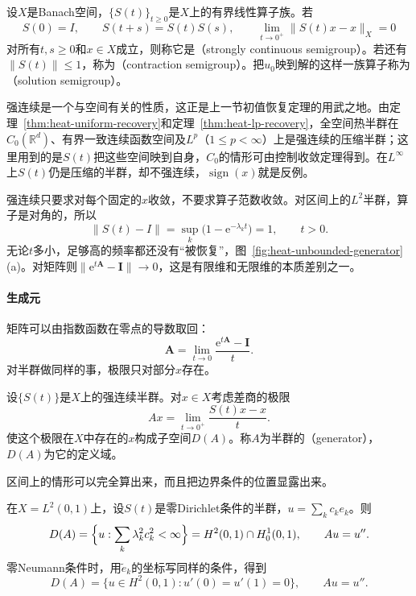 \begin{definition}[强连续半群]
\label{def:heat-c0-semigroup}
设$X$是Banach空间，$\{S(t)\}_{t\geq0}$是$X$上的有界线性算子族。若
\begin{equation}
 S(0)=I,\qquad S(t+s)=S(t)S(s),\qquad \lim_{t\to0^+}\lVert S(t)x-x\rVert_X=0
 \label{eq:heat-c0-semigroup}
\end{equation}
对所有$t,s\geq0$和$x\in X$成立，则称它是（strongly continuous semigroup）。若还有$\lVert S(t)\rVert\leq1$，称为（contraction semigroup）。把$u_0$映到解的这样一族算子称为（solution semigroup）。
\end{definition}

强连续是一个与空间有关的性质，这正是上一节初值恢复定理的用武之地。由定理~\ref{thm:heat-uniform-recovery}和定理~\ref{thm:heat-lp-recovery}，全空间热半群在$C_0(\mathbb{R}^{d})$、有界一致连续函数空间及$L^p$（$1\leq p<\infty$）上是强连续的压缩半群；这里用到的是$S(t)$把这些空间映到自身，$C_0$的情形可由控制收敛定理得到。在$L^\infty$上$S(t)$仍是压缩的半群，却不强连续，$\operatorname{sign}(x)$就是反例。

强连续只要求对每个固定的$x$收敛，不要求算子范数收敛。对区间上的$L^2$半群，算子是对角的，所以
\[
 \lVert S(t)-I\rVert=\sup_k\bigl(1-\mathrm{e}^{-\lambda_kt}\bigr)=1,\qquad t>0 .
\]
无论$t$多小，足够高的频率都还没有“被恢复”，图~\ref{fig:heat-unbounded-generator}(a)。对矩阵则$\lVert\mathrm{e}^{t\bm{A}}-\bm{I}\rVert\to0$，这是有限维和无限维的本质差别之一。

\paragraph{生成元}
矩阵可以由指数函数在零点的导数取回：
\[
 \bm{A}=\lim_{t\to0}\frac{\mathrm{e}^{t\bm{A}}-\bm{I}}{t} .
\]
对半群做同样的事，极限只对部分$x$存在。

\begin{definition}[生成元]
\label{def:heat-generator}
设$\{S(t)\}$是$X$上的强连续半群。对$x\in X$考虑差商的极限
\begin{equation}
 Ax=\lim_{t\to0^+}\frac{S(t)x-x}{t} .
 \label{eq:heat-generator-limit}
\end{equation}
使这个极限在$X$中存在的$x$构成子空间$D(A)$。称$A$为半群的（generator），$D(A)$为它的定义域。
\end{definition}

区间上的情形可以完全算出来，而且把边界条件的位置显露出来。

\begin{theorem}[区间热半群的生成元]
\label{thm:heat-generator}
在$X=L^2(0,1)$上，设$S(t)$是零Dirichlet条件的半群，$u=\sum_kc_ke_k$。则
\begin{equation}
 D(A)=\Bigl\{u:\sum_k\lambda_k^2c_k^2<\infty\Bigr\}=H^2(0,1)\cap H^1_0(0,1),\qquad Au=u'' .
 \label{eq:heat-generator-dirichlet}
\end{equation}
零Neumann条件时，用$\tilde{e}_k$的坐标写同样的条件，得到
\begin{equation}
 D(A)=\{u\in H^2(0,1):u'(0)=u'(1)=0\},\qquad Au=u'' .
 \label{eq:heat-generator-neumann}
\end{equation}
\end{theorem}

